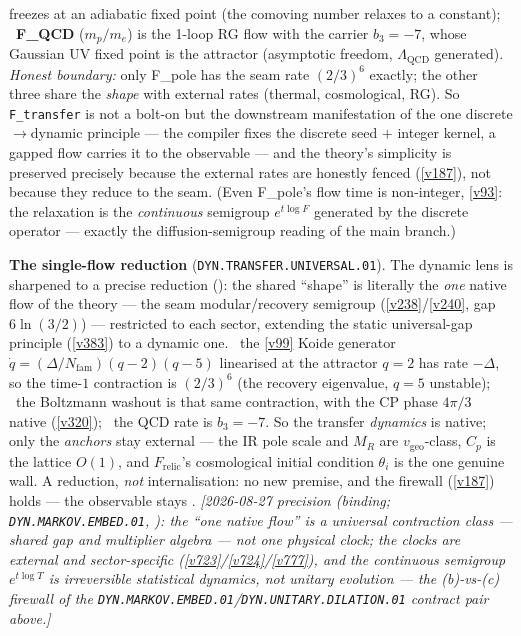 \documentclass[11pt,a4paper]{article}
\newcommand{\Nfam}{N_{\mathrm{fam}}}
\begin{document}
freezes at an adiabatic fixed point (the comoving number relaxes to a constant); \mE\ \textbf{F\_QCD} ($m_p/m_e$)
is the 1-loop RG flow with the carrier $b_3{=}-7$, whose Gaussian UV fixed point is the attractor (asymptotic
freedom, $\Lambda_{\mathrm{QCD}}$ generated). \emph{Honest boundary:} only F\_pole has the seam rate $(2/3)^6$
exactly; the other three share the \emph{shape} with external rates (thermal, cosmological, RG). So
\texttt{F\_transfer} is not a bolt-on but the downstream manifestation of the one discrete$\to$dynamic principle
--- the compiler fixes the discrete seed $+$ integer kernel, a gapped flow carries it to the observable --- and
the theory's simplicity is preserved precisely because the external rates are honestly fenced (\vref{v187}), not
because they reduce to the seam. (Even F\_pole's flow time is non-integer, \vref{v93}: the relaxation is the
\emph{continuous} semigroup $e^{t\log F}$ generated by the discrete operator --- exactly the diffusion-semigroup
reading of the main branch.)
\par\smallskip\noindent\textbf{The single-flow reduction} (\texttt{DYN.TRANSFER.UNIVERSAL.01}). The dynamic
lens is sharpened to a precise reduction (): the shared
``shape'' is literally the \emph{one} native flow of the theory --- the seam modular/recovery semigroup
(\vref{v238}/\vref{v240}, gap $6\ln(3/2)$) --- restricted to each sector, extending the static
universal-gap principle (\vref{v383}) to a dynamic one. \mE\ the \vref{v99} Koide generator
$\dot q{=}(\Delta/\Nfam)(q{-}2)(q{-}5)$ linearised at the attractor $q{=}2$ has rate $-\Delta$, so the
time-$1$ contraction is $(2/3)^6$ (the recovery eigenvalue, $q{=}5$ unstable); \mE\ the Boltzmann washout
is that same contraction, with the CP phase $4\pi/3$ native (\vref{v320}); \mE\ the QCD rate is
$b_3{=}-7$. So the transfer \emph{dynamics} is native; only the \emph{anchors} stay external --- the IR
pole scale and $M_R$ are $v_{\mathrm{geo}}$-class, $C_p$ is the lattice $O(1)$, and $F_{\mathrm{relic}}$'s
cosmological initial condition $\theta_i$ is the one genuine wall. A reduction, \emph{not} internalisation:
no new premise, and the firewall (\vref{v187}) holds --- the observable stays \mC.
\emph{[2026-08-27 precision (binding; \texttt{DYN.MARKOV.EMBED.01},
): the ``one native flow'' is a universal
\emph{contraction class} --- shared gap and multiplier algebra --- not one physical clock; the
clocks are external and sector-specific (\vref{v723}/\vref{v724}/\vref{v777}), and the
continuous semigroup $e^{t\log T}$ is irreversible statistical dynamics, not unitary evolution
--- the (b)-vs-(c) firewall of the
\texttt{DYN.MARKOV.EMBED.01}/\texttt{DYN.UNITARY.DILATION.01} contract pair above.]}
\end{document}
